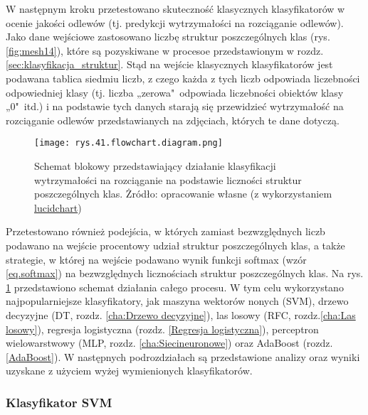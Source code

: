 W następnym kroku przetestowano skuteczność klasycznych klasyfikatorów w ocenie jakości odlewów (tj. predykcji wytrzymałości na rozciąganie odlewów). Jako dane wejściowe zastosowano liczbę struktur poszczególnych klas (rys. \ref{fig:mesh14}), które są pozyskiwane w procesoe przedstawionym w rozdz. \ref{sec:klasyfikacja_struktur}. Stąd na wejście klasycznych klasyfikatorów jest podawana tablica siedmiu liczb, z czego każda z tych liczb odpowiada liczebności odpowiedniej klasy (tj. liczba „zerowa"~odpowiada liczebności obiektów klasy „0"~itd.) i na podstawie tych danych starają się przewidzieć wytrzymałość na rozciąganie odlewów przedstawianych na zdjęciach, których te dane dotyczą. 
\begin{figure}[h]
    \centering
    \texttt{[image: rys.41.flowchart.diagram.png]}
    \caption{Schemat blokowy przedstawiający działanie klasyfikacji wytrzymałości na rozciąganie na podstawie liczności struktur poszczególnych klas. Żródło: opracowanie własne (z wykorzystaniem \href{https://www.lucidchart.com}{lucidchart})}
    \label{rys.41.flowchart.diagram.png}
\end{figure}
Przetestowano również podejścia, w których zamiast bezwzględnych liczb podawano na wejście procentowy udział struktur poszczególnych klas, a także strategie, w której na wejście podawano wynik funkcji softmax (wzór \ref{eq.softmax}) na bezwzględnych licznościach struktur poszczególnych klas. Na rys. \ref{rys.41.flowchart.diagram.png} przedstawiono schemat działania całego procesu.
W tym celu wykorzystano najpopularniejsze klasyfikatory, jak maszyna wektorów nonych (SVM), drzewo decyzyjne (DT, rozdz. \ref{cha:Drzewo decyzyjne}), las losowy (RFC, rozdz.\ref{cha:Las losowy}), regresja logistyczna (rozdz. \ref{Regresja logistyczna}), perceptron wielowarstwowy (MLP, rozdz. \ref{cha:Siecineuronowe}) oraz AdaBoost (rozdz. \ref{AdaBoost}). W następnych podrozdziałach są przedstawione analizy oraz wyniki uzyskane z użyciem wyżej wymienionych klasyfikatorów.

\subsubsection{Klasyfikator SVM}
\label{structures.with.svm}


